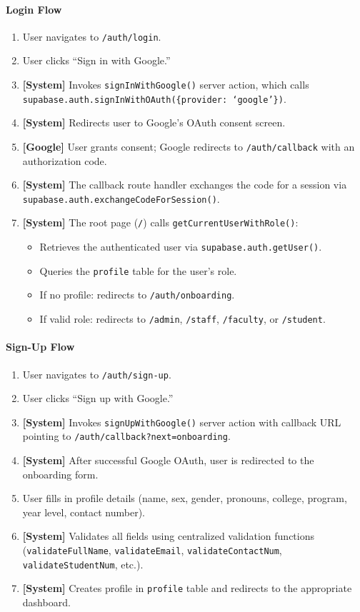 \documentclass[11pt,a4paper]{article}
\begin{document}
\paragraph{Login Flow}
\begin{enumerate}[leftmargin=1.5em]
  \item User navigates to \texttt{/auth/login}.
  \item User clicks ``Sign in with Google.''
  \item \textbf{[System]} Invokes \texttt{signInWithGoogle()} server action, which calls \texttt{supabase.auth.signInWithOAuth(\{provider: `google'\})}.
  \item \textbf{[System]} Redirects user to Google's OAuth consent screen.
  \item \textbf{[Google]} User grants consent; Google redirects to \texttt{/auth/callback} with an authorization code.
  \item \textbf{[System]} The callback route handler exchanges the code for a session via \texttt{supabase.auth.exchangeCodeForSession()}.
  \item \textbf{[System]} The root page (\texttt{/}) calls \texttt{getCurrentUserWithRole()}:
    \begin{itemize}
      \item Retrieves the authenticated user via \texttt{supabase.auth.getUser()}.
      \item Queries the \texttt{profile} table for the user's role.
      \item If no profile: redirects to \texttt{/auth/onboarding}.
      \item If valid role: redirects to \texttt{/admin}, \texttt{/staff}, \texttt{/faculty}, or \texttt{/student}.
    \end{itemize}
\end{enumerate}

\paragraph{Sign-Up Flow}
\begin{enumerate}[leftmargin=1.5em]
  \item User navigates to \texttt{/auth/sign-up}.
  \item User clicks ``Sign up with Google.''
  \item \textbf{[System]} Invokes \texttt{signUpWithGoogle()} server action with callback URL pointing to \texttt{/auth/callback?next=onboarding}.
  \item \textbf{[System]} After successful Google OAuth, user is redirected to the onboarding form.
  \item User fills in profile details (name, sex, gender, pronouns, college, program, year level, contact number).
  \item \textbf{[System]} Validates all fields using centralized validation functions (\texttt{validateFullName}, \texttt{validateEmail}, \texttt{validateContactNum}, \texttt{validateStudentNum}, etc.).
  \item \textbf{[System]} Creates profile in \texttt{profile} table and redirects to the appropriate dashboard.
\end{enumerate}
\end{document}
